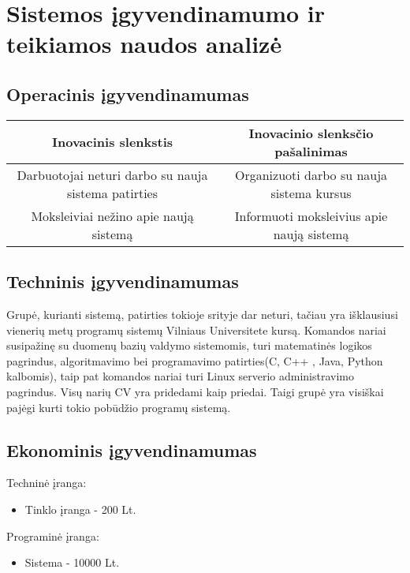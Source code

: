 \chapter{Sistemos \k{i}gyvendinamumo ir teikiamos naudos analiz\.{e}}



\section{Operacinis \k{i}gyvendinamumas}

\begin{tabular}{|c|c|}
\hline 
Inovacinis slenkstis & Inovacinio slenks\v{c}io pašalinimas\tabularnewline
\hline 
Darbuotojai neturi darbo su nauja sistema patirties & Organizuoti darbo su nauja sistema kursus\tabularnewline
\hline 
Moksleiviai nežino apie nauj\k{a} sistem\k{a} & Informuoti moksleivius apie nauj\k{a} sistem\k{a}\tabularnewline
\hline
\end{tabular}

\section{Techninis \k{i}gyvendinamumas}

Grup\.{e}, kurianti sistem\k{a}, patirties tokioje srityje dar neturi,
ta\v{c}iau yra išklausiusi vieneri\k{u} met\k{u} program\k{u} sistem\k{u}
Vilniaus Universitete kurs\k{a}. Komandos nariai susipažin\k{e} su
duomen\k{u} bazi\k{u} valdymo sistemomis, turi matematin\.{e}s logikos
pagrindus, algoritmavimo bei programavimo patirties(C, C++ , Java,
Python kalbomis), taip pat komandos nariai turi Linux serverio 
administravimo
pagrindus. Vis\k{u} nari\k{u} CV yra pridedami kaip priedai. Taigi
grup\.{e} yra visiškai paj\.{e}gi kurti tokio pob\={u}džio program\k{u}
sistem\k{a}.


\section{Ekonominis \k{i}gyvendinamumas}

Technin\.{e} \k{i}ranga:
\begin{itemize}
  \item Tinklo \k{i}ranga - 200 Lt.
\end{itemize}

Programin\.{e} \k{i}ranga:
\begin{itemize}
  \item Sistema - 10000 Lt.
\end{itemize}

